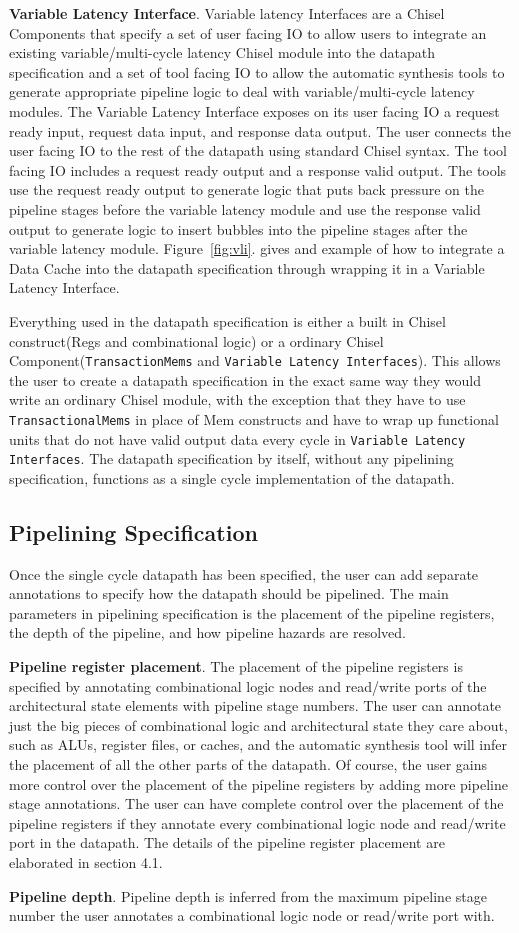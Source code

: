 {\bf Variable Latency Interface}. Variable latency Interfaces are a
Chisel Components that specify a set of user facing IO to allow users
to integrate an existing variable/multi-cycle latency Chisel module
into the datapath specification and a set of tool facing IO to allow
the automatic synthesis tools to generate appropriate pipeline logic
to deal with variable/multi-cycle latency modules. The Variable
Latency Interface exposes on its user facing IO a request ready input,
request data input, and response data output. The user connects the
user facing IO to the rest of the datapath using standard Chisel
syntax. The tool facing IO includes a request ready output and a
response valid output. The tools use the request ready output to
generate logic that puts back pressure on the pipeline stages before
the variable latency module and use the response valid output to
generate logic to insert bubbles into the pipeline stages after the
variable latency module. Figure~\ref{fig:vli}. gives and example of how to
integrate a Data Cache into the datapath specification through
wrapping it in a Variable Latency Interface.

Everything used in the datapath specification is either a built in
Chisel construct(Regs and combinational logic) or a ordinary Chisel
Component({\tt TransactionMems} and {\tt Variable Latency Interfaces}). This
allows the user to create a datapath specification in the exact same
way they would write an ordinary Chisel module, with the exception
that they have to use {\tt TransactionalMems} in place of Mem constructs and
have to wrap up functional units that do not have valid output data
every cycle in {\tt Variable Latency Interfaces}. The datapath specification
by itself, without any pipelining specification, functions as a single
cycle implementation of the datapath.

\subsection {Pipelining Specification}
Once the single cycle datapath has been specified, the user can add
separate annotations to specify how the datapath should be
pipelined. The main parameters in pipelining specification is the
placement of the pipeline registers, the depth of the pipeline, and
how pipeline hazards are resolved.

{\bf Pipeline register placement}. The placement of the pipeline
registers is specified by annotating combinational logic nodes and
read/write ports of the architectural state elements with pipeline
stage numbers. The user can annotate just the big pieces of combinational
logic and architectural state they care about, such as ALUs, register
files, or caches, and the automatic synthesis tool will infer the
placement of all the other parts of the datapath. Of course, the user
gains more control over the placement of the pipeline registers by
adding more pipeline stage annotations. The user can have complete
control over the placement of the pipeline registers if they annotate
every combinational logic node and read/write port in the datapath. The details of the pipeline
register placement are elaborated in section 4.1.

{\bf Pipeline depth}. Pipeline depth is inferred from the maximum
pipeline stage number the user annotates a combinational logic node or
read/write port with.


